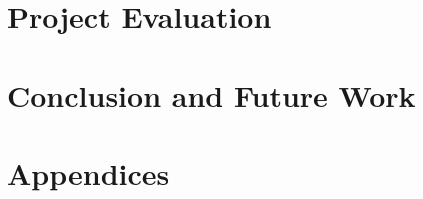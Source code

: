 \documentclass[12pt]{report}
\numberwithin{figure}{chapter}
\begin{document}
\chapter{Project Evaluation}

\chapter{Conclusion and Future Work}
                                           
\newpage
% 


\appendix
\renewcommand{\thefigure}{\Alph{section}.\arabic{figure}}
\renewcommand{\thetable}{\Alph{section}.\arabic{table}}
\chapter*{Appendices}
\newcommand{\customappendix}[1]{
    \section*{#1}
    \addcontentsline{toc}{section}{#1}
    \refstepcounter{section}
    \label{#1}
}
\end{document}
